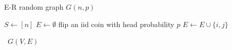 \begin{algorithm}
    \caption{E-R random graph $G(n,p)$}\label{alg:er_rg}
    \begin{algorithmic}%
        \State$S \gets [n]$\@
        \State$E \gets \emptyset$\@
            \State flip an iid coin with head probability $p$\@
                \State $E \gets E \cup \{i,j\}$
            \EndIf\@
        \EndFor\@

        \State\Return~$G(V,E)$
    \end{algorithmic}
\end{algorithm}